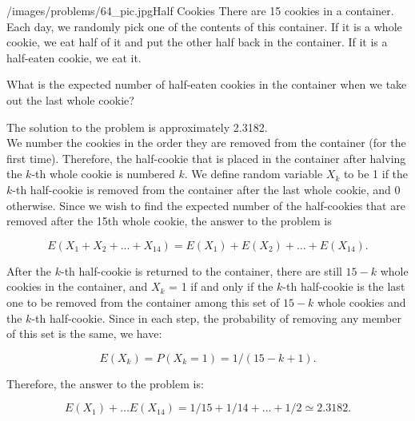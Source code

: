 \begin{problem}{/images/problems/64_pic.jpg}{Half Cookies} There are 15 cookies in a container. Each day, we randomly pick one of the contents of this container. If it is a whole cookie, we eat half of it and put the other half back in the container. If it is a half-eaten cookie, we eat it.
	
What is the expected number of half-eaten cookies  in the container when we take out the last whole cookie?
\end{problem}
\begin{solution}
The solution to the problem is approximately 2.3182.\\[0.2cm]

We number the cookies in the order they are removed from the container (for the first time). Therefore, the half-cookie that is placed in the container after halving the $k$-th whole cookie is numbered $k$. We define random variable $X_k$ to be 1 if the $k$-th half-cookie is removed from the container after the last whole cookie, and 0 otherwise.
Since we wish to find the expected number of the half-cookies that are removed after the 15th whole cookie, the answer to the problem is

$$E(X_1 + X_2 + ... + X_{14}) = E(X_1) + E(X_2) + \ldots + E(X_{14}).$$

After the $k$-th half-cookie is returned to the container, there are still $15 - k$ whole cookies in the container, and $X_k$ = 1 if and only if the $k$-th half-cookie is the last one to be removed from the container among this set of $15 - k$ whole cookies and the $k$-th half-cookie. Since in each step, the probability of removing any member of this set is the same, we have:

$$E(X_k) = P(X_k = 1) = 1 / (15 - k + 1).$$

Therefore, the answer to the problem is:

$$E(X_1) + \ldots E(X_{14}) = 1/15 + 1/14 + \ldots + 1/2  \simeq 2.3182.$$


\end{solution}

